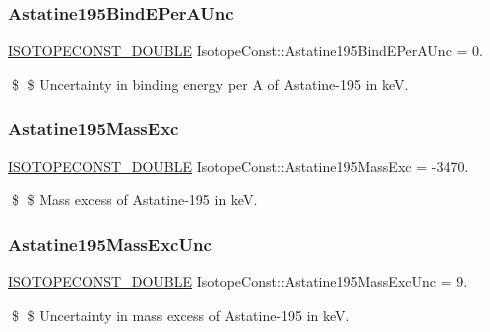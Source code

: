 \subsubsection{\texorpdfstring{Astatine195\+Bind\+E\+Per\+A\+Unc}{Astatine195BindEPerAUnc}}
{\footnotesize\ttfamily \mbox{\hyperlink{group___isotope_const-_macros_ga8f45a7272ce02c0b4c65c44636ed719a}{I\+S\+O\+T\+O\+P\+E\+C\+O\+N\+S\+T\+\_\+\+D\+O\+U\+B\+LE}} Isotope\+Const\+::\+Astatine195\+Bind\+E\+Per\+A\+Unc = 0.}

\$ \$ Uncertainty in binding energy per A of Astatine-\/195 in keV. \mbox{\label{group___isotope_const-_astatine-_at195_gaf0a295c330b1e294dfc0bf7388d5a3ad}} 
\subsubsection{\texorpdfstring{Astatine195\+Mass\+Exc}{Astatine195MassExc}}
{\footnotesize\ttfamily \mbox{\hyperlink{group___isotope_const-_macros_ga8f45a7272ce02c0b4c65c44636ed719a}{I\+S\+O\+T\+O\+P\+E\+C\+O\+N\+S\+T\+\_\+\+D\+O\+U\+B\+LE}} Isotope\+Const\+::\+Astatine195\+Mass\+Exc = -\/3470.}

\$ \$ Mass excess of Astatine-\/195 in keV. \mbox{\label{group___isotope_const-_astatine-_at195_ga9b5b6096e983450502dc79a1f8d6e00f}} 
\subsubsection{\texorpdfstring{Astatine195\+Mass\+Exc\+Unc}{Astatine195MassExcUnc}}
{\footnotesize\ttfamily \mbox{\hyperlink{group___isotope_const-_macros_ga8f45a7272ce02c0b4c65c44636ed719a}{I\+S\+O\+T\+O\+P\+E\+C\+O\+N\+S\+T\+\_\+\+D\+O\+U\+B\+LE}} Isotope\+Const\+::\+Astatine195\+Mass\+Exc\+Unc = 9.}

\$ \$ Uncertainty in mass excess of Astatine-\/195 in keV. \mbox{\label{group___isotope_const-_astatine-_at195_ga463dd9dc6826ec622143a71806b84fcb}} 
